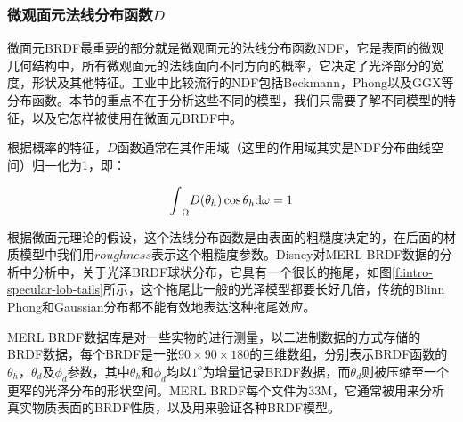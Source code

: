 \subsubsection{微观面元法线分布函数$D$}
微面元BRDF最重要的部分就是微观面元的法线分布函数NDF，它是表面的微观几何结构中，所有微观面元的法线面向不同方向的概率，它决定了光泽部分的宽度，形状及其他特征。工业中比较流行的NDF包括Beckmann\cite{a:TheScatteringofElectromagneticWavesfromRoughSurfaces}，Phong\cite{a:IlluminationforComputerGeneratedPictures}以及GGX\cite{a:Microfacetmodelsforrefractionthroughroughsurfaces}等分布函数。本节的重点不在于分析这些不同的模型，我们只需要了解不同模型的特征，以及它怎样被使用在微面元BRDF中。


根据概率的特征，$D$函数通常在其作用域（这里的作用域其实是NDF分布曲线空间）归一化为1，即：

\begin{equation}
	{\rm \int}_\Omega D(\theta_h)\cos\theta_h {\rm d}\omega =1
\end{equation}

根据微面元理论的假设，这个法线分布函数是由表面的粗糙度决定的，在后面的材质模型中我们用$roughness$表示这个粗糙度参数。Disney对MERL BRDF\cite{a:AData-DrivenReflectanceModel}数据的分析中分析中，关于光泽BRDF球状分布，它具有一个很长的拖尾，如图\ref{f:intro-specular-lob-tails}所示，这个拖尾比一般的光泽模型都要长好几倍，传统的Blinn Phong和Gaussian分布都不能有效地表达这种拖尾效应。

\begin{shaded}
MERL BRDF数据库是对一些实物的进行测量，以二进制数据的方式存储的BRDF数据，每个BRDF是一张$90\times 90\times 180$的三维数组，分别表示BRDF函数的$\theta_h$，$\theta_d$及$\phi_d$参数，其中$\theta_h$和$\phi_d$均以$1^o$为增量记录BRDF数据，而$\theta_d$则被压缩至一个更窄的光泽分布的形状空间。MERL BRDF每个文件为33M，它通常被用来分析真实物质表面的BRDF性质，以及用来验证各种BRDF模型。
\end{shaded}


